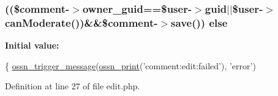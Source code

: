 \subsubsection[{\texorpdfstring{else}{else}}]{ ((\$comment-\/$>${\bf owner\+\_\+guid}==\${\bf user}-\/$>$guid$\vert$$\vert$\${\bf user}-\/$>$can\+Moderate())\&\&\$comment-\/$>$save()) else}\hypertarget{components_2_ossn_comments_2actions_2comment_2edit_8php_ad15aa746af6df58f5a69621972c6aee7}{}\label{components_2_ossn_comments_2actions_2comment_2edit_8php_ad15aa746af6df58f5a69621972c6aee7}
{\bfseries Initial value\+:}
\begin{DoxyCode}
\{
        \hyperlink{ossn_8lib_8system_8php_ab3f23f23f32f50c12e7aea0ffaccaac7}{ossn\_trigger\_message}(\hyperlink{ossn_8lib_8languages_8php_a2be5d1c4b695593a9b9067b96df2150a}{ossn\_print}(\textcolor{stringliteral}{'comment:edit:failed'}), \textcolor{stringliteral}{'error'})
\end{DoxyCode}


Definition at line 27 of file edit.\+php.

